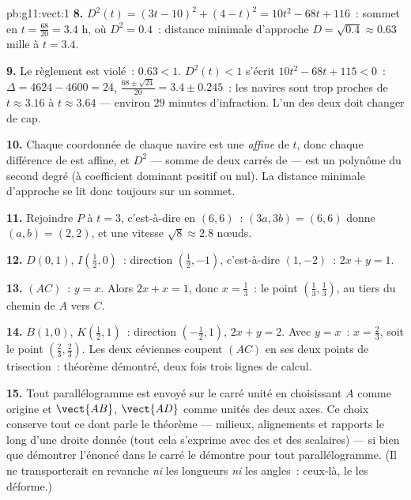 \begin{solution}{pb:g11:vect:1}
\textbf{8.} $D^2(t) = (3t - 10)^2 + (4 - t)^2 =
10t^2 - 68t + 116$~: sommet en $t = \frac{68}{20} = 3.4$ h, où
$D^2 = 0.4$~: distance minimale d'approche
$D = \sqrt{0.4} \approx 0.63$ mille à $t = 3.4$.

\textbf{9.} Le règlement est violé~: $0.63 < 1$. $D^2(t) < 1$
s'écrit $10t^2 - 68t + 115 < 0$~: $\Delta = 4624 - 4600 = 24$,
 $\frac{68 \pm \sqrt{24}}{20} = 3.4 \pm 0.245$~: les navires
sont trop proches de $t \approx 3.16$ à $t \approx 3.64$ ---
environ $29$ minutes d'infraction. L'un des deux doit changer de
cap.

\textbf{10.} Chaque coordonnée de chaque navire est une 
\emph{affine} de $t$, donc chaque différence de  est
affine, et $D^2$ --- somme de deux carrés de  ---
est un polynôme du second degré (à coefficient dominant positif ou
nul). La distance minimale d'approche se lit donc toujours sur un
sommet.

\textbf{11.} Rejoindre $P$ à $t = 3$, c'est-à-dire en $(6, 6)$~:
$(3a, 3b) = (6, 6)$ donne $(a, b) = (2, 2)$, et une vitesse
$\sqrt{8} \approx 2.8$ nœuds.

\textbf{12.} $D(0, 1)$, $I\left(\frac12, 0\right)$~: direction
$\left(\frac12, -1\right)$, c'est-à-dire $(1, -2)$~: 
$2x + y = 1$.

\textbf{13.} $(AC)$~: $y = x$. Alors $2x + x = 1$, donc
$x = \frac13$~: le point $\left(\frac13, \frac13\right)$, au tiers
du chemin de $A$ vers $C$.

\textbf{14.} $B(1, 0)$, $K\left(\frac12, 1\right)$~: direction
$\left(-\frac12, 1\right)$,  $2x + y = 2$. Avec $y = x$~:
$x = \frac23$, soit le point $\left(\frac23, \frac23\right)$. Les
deux céviennes coupent $(AC)$ en ses deux points de trisection~:
théorème démontré, deux fois trois lignes de calcul.

\textbf{15.} Tout parallélogramme est envoyé sur le carré unité en
choisissant $A$ comme origine et $\vect{AB}$, $\vect{AD}$ comme
unités des deux axes. Ce choix conserve tout ce dont parle le
théorème --- milieux, alignements et rapports le long d'une droite
donnée (tout cela s'exprime avec des  et des scalaires) ---
si bien que démontrer l'énoncé dans le carré le démontre pour tout
parallélogramme. (Il ne transporterait en revanche \emph{ni} les
longueurs \emph{ni} les angles~: ceux-là, le  les déforme.)


\end{solution}
